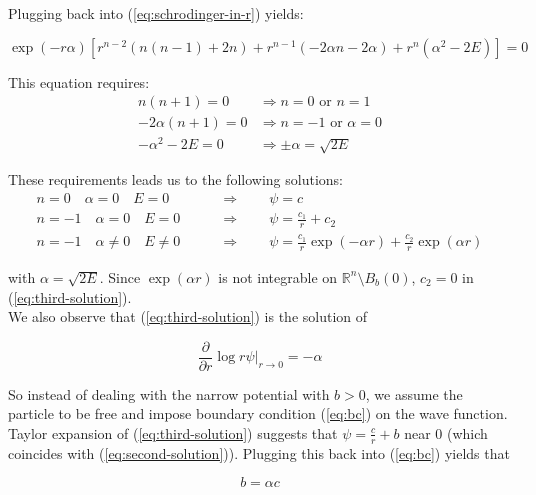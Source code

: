\documentclass[11pt, a4paper, german]{article}
\theoremstyle{plain}
\theoremstyle{definition}
\theoremstyle{remark}
\numberwithin{equation}{section}
\numberwithin{theorem}{section}
\begin{document}
Plugging back into (\ref{eq:schrodinger-in-r}) yields:

\begin{equation}
\exp(-r\alpha)\left[r^{n-2} (n(n-1) + 2n) + r^{n-1} (-2\alpha n - 2\alpha) + r^n (\alpha^2-2E)\right] = 0
\end{equation}

This equation requires:
\begin{align}
n(n+1)=0 &\Rightarrow n=0 \text{ or } n=1\\
-2\alpha(n+1) = 0 &\Rightarrow n = -1 \text{ or } \alpha = 0\\
-\alpha^2 - 2E = 0 &\Rightarrow \pm \alpha = \sqrt{2E}
\end{align}

These requirements leads us to the following solutions:
\begin{align}
n=0 \quad \alpha=0 \quad E=0 & \quad\quad \Rightarrow \quad\quad \psi= c\label{eq:first-solution}\\[5pt]
n=-1\quad \alpha=0 \quad E=0 & \quad\quad \Rightarrow \quad\quad \psi = \frac{c_1}{r} + c_2\label{eq:second-solution}\\[5pt]
n=-1\quad \alpha\neq0 \quad E \neq 0 & \quad\quad \Rightarrow \quad\quad \psi = \frac{c_1}{r} \exp(-\alpha r) + \frac{c_2}{r} \exp(\alpha r)\label{eq:third-solution}
\end{align}

with $\alpha = \sqrt{2E}$. Since $\exp(\alpha r)$ is not integrable on $\mathbb R ^n \setminus B_b(0)$, $c_2=0$ in (\ref{eq:third-solution}).\\

We also observe that (\ref{eq:third-solution}) is the solution of

\begin{equation}
\frac{\partial}{\partial r}\log r\psi | _{r\rightarrow 0} = -\alpha\label{eq:bc}
\end{equation}

So instead of dealing with the narrow potential with $b>0$, we assume the particle to be free and impose boundary condition (\ref{eq:bc}) on the wave function.\\

Taylor expansion of (\ref{eq:third-solution}) suggests that $\psi = \frac{c}{r}+b$ near 0 (which coincides with (\ref{eq:second-solution})). Plugging this back into (\ref{eq:bc}) yields that

\begin{equation}
b=\alpha c
\end{equation}
\end{document}
